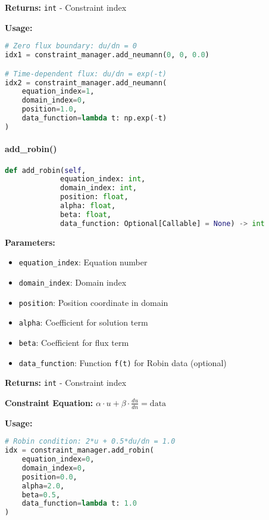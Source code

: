 \textbf{Returns:} \texttt{int} - Constraint index

\textbf{Usage:}
\begin{lstlisting}[language=Python, caption=Add Neumann Usage]
# Zero flux boundary: du/dn = 0
idx1 = constraint_manager.add_neumann(0, 0, 0.0)

# Time-dependent flux: du/dn = exp(-t)
idx2 = constraint_manager.add_neumann(
    equation_index=1,
    domain_index=0,
    position=1.0,
    data_function=lambda t: np.exp(-t)
)
\end{lstlisting}

\paragraph{add\_robin()}\leavevmode
\begin{lstlisting}[language=Python, caption=Add Robin Method]
def add_robin(self, 
             equation_index: int, 
             domain_index: int, 
             position: float,
             alpha: float, 
             beta: float,
             data_function: Optional[Callable] = None) -> int
\end{lstlisting}

\textbf{Parameters:}
\begin{itemize}
    \item \texttt{equation\_index}: Equation number
    \item \texttt{domain\_index}: Domain index
    \item \texttt{position}: Position coordinate in domain
    \item \texttt{alpha}: Coefficient for solution term
    \item \texttt{beta}: Coefficient for flux term
    \item \texttt{data\_function}: Function \texttt{f(t)} for Robin data (optional)
\end{itemize}

\textbf{Returns:} \texttt{int} - Constraint index

\textbf{Constraint Equation:} $\alpha \cdot u + \beta \cdot \frac{du}{dn} = \text{data}$

\textbf{Usage:}
\begin{lstlisting}[language=Python, caption=Add Robin Usage]
# Robin condition: 2*u + 0.5*du/dn = 1.0
idx = constraint_manager.add_robin(
    equation_index=0,
    domain_index=0,
    position=0.0,
    alpha=2.0,
    beta=0.5,
    data_function=lambda t: 1.0
)
\end{lstlisting}

